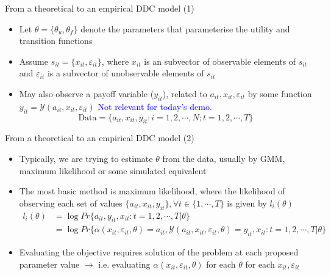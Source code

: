 \documentclass[aspectratio=169]{beamer}
\begin{document}
	\begin{frame}{From a theoretical to an empirical DDC model (1)}
		\begin{itemize}[<+->]
			\itemsep1em
			\item Let $\theta = \{\theta_u,\theta_f\}$ denote the parameters that parameterise the utility and transition functions
			\item Assume $s_{it} = \{x_{it},\varepsilon_{it}\}$, where $x_{it}$ is an subvector of observable elements of $s_{it}$ and $\varepsilon_{it}$ is a subvector of unobservable elements of $s_{it}$
			\item May also observe a payoff variable ($y_{it}$), related to $a_{it},x_{it},\varepsilon_{it}$ by some function $y_{it} = \mathcal{Y}(a_{it},x_{it},\varepsilon_{it})$ \textcolor{blue}{Not relevant for today's demo.}
			\begin{equation}
				\text{Data} = \{a_{it},x_{it},y_{it}: i = 1,2,\cdots,N; t= 1,2,\cdots,T\}
			\end{equation}
		\end{itemize}
	\end{frame}
	
	\begin{frame}{From a theoretical to an empirical DDC model (2)}
		\begin{itemize}[<+->]
			\itemsep1em
			\item Typically, we are trying to estimate $\theta$ from the data, usually by GMM, maximum likelihood or some simulated equivalent
			\item The most basic method is maximum likelihood, where the likelihood of observing each set of values $\{a_{it},x_{it},y_{it}\}, \forall t \in \{1,\cdots,T\}$ is given by $l_i(\theta)$
			\begin{align*}
				l_i(\theta) &= \log Pr\{a_{it},y_{it},x_{it}: t = 1,2,\cdots,T | \theta \} \\
				&= \log Pr\{\alpha(x_{it},\varepsilon_{it},\theta) = a_{it}, \mathcal{Y}(a_{it},x_{it},\varepsilon_{it},\theta) = y_{it},x_{it}: t = 1,2,\cdots,T | \theta\}
			\end{align*}
			\item Evaluating the objective requires solution of the problem at each proposed parameter value $\rightarrow$ i.e. evaluating $\alpha(x_{it},\varepsilon_{it},\theta)$ for each $\theta$ for each $x_{it},\varepsilon_{it}$
		\end{itemize}
	\end{frame}
	
\end{document}

